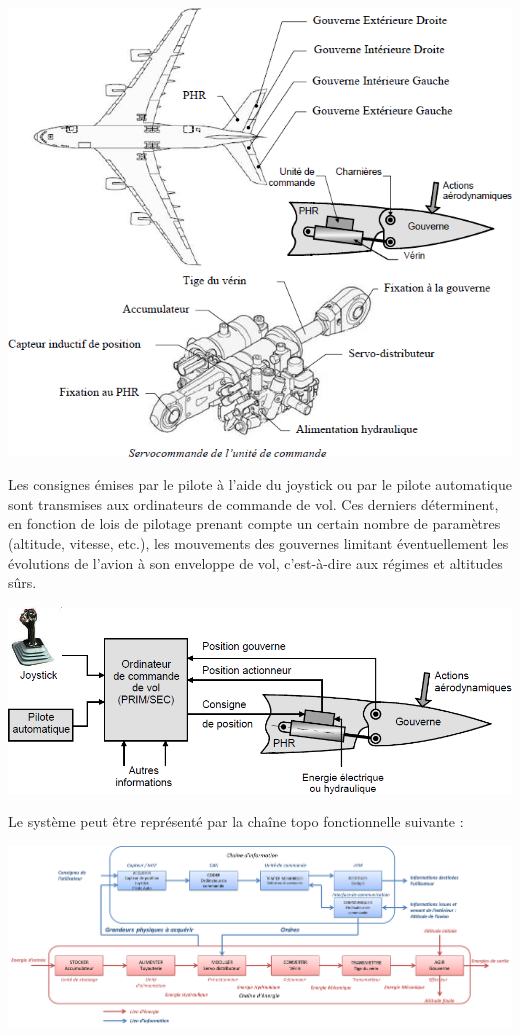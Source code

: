 \documentclass[11pt,oneside]{article}
\begin{document}
{\begin{center}
\includegraphics[width=.9\textwidth]{png/img3}
\end{center}
\begin{center}
\end{center}

Les consignes émises par le pilote à l'aide du joystick ou par le pilote automatique sont transmises aux ordinateurs de commande de vol. Ces derniers déterminent, en fonction de lois de pilotage prenant compte un certain nombre de paramètres (altitude, vitesse, etc.), les mouvements des gouvernes limitant éventuellement les évolutions de l'avion à son enveloppe de vol, c'est-à-dire aux régimes et altitudes sûrs.


\begin{center}
\includegraphics[width=.9\textwidth]{png/img4}
\end{center}

Le système peut être représenté par la chaîne topo fonctionnelle suivante : 
\begin{center}
\includegraphics[width=\textwidth]{png/chaine}
\end{center}
}
\end{document}
